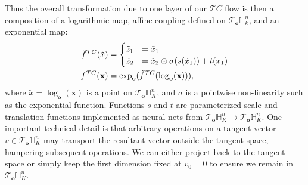 Thus the overall transformation due to one layer of our $\mathcal{T}C$ flow is then a composition of a logarithmic map, affine coupling defined on $\mathcal{T}_{\textbf{o}}\mathbb{H}^n_k$, and an exponential map:
\begin{align}
    \label{eq:tangent_coupling}
     \tilde{f}^{\mathcal{T}C}(\tilde{x}) &=
     \begin{cases}
     \tilde{z}_{1} &= \tilde{x}_{1} \\
     \tilde{z}_{2} &= \tilde{x}_{2} \odot \sigma(s(\tilde{x}_{1})) + t(x_1) \nonumber
     \end{cases}\\
    f^{\mathcal{T}C}(\mathbf{x}) &= \textnormal{exp}_{\textbf{o}}(\tilde{f}^{\mathcal{T}C}(\log_{\textbf{o}}(\textbf{x}))),
\end{align}
where $\tilde{x} = \log_{\textbf{o}}(\textbf{x})$ is a point on $\mathcal{T}_{\textbf{o}}\mathbb{H}^n_K$, and $\sigma$ is a pointwise non-linearity such as the exponential function. Functions $s$ and $t$ are parameterized scale and translation functions implemented as neural nets from $\mathcal{T}_{\textbf{o}}\mathbb{H}^{n}_K \to \mathcal{T}_{\textbf{o}}\mathbb{H}^{n}_K$.
One important technical detail is that arbitrary operations on a tangent vector $v \in \mathcal{T}_{\textbf{o}}\mathbb{H}^n_K$ may transport the resultant vector outside the tangent space, hampering subsequent operations. We can either project back to the tangent space or simply keep the first dimension fixed at $v_0 = 0$ to ensure we remain in $\mathcal{T}_{\textbf{o}}\mathbb{H}^{n}_K$.

